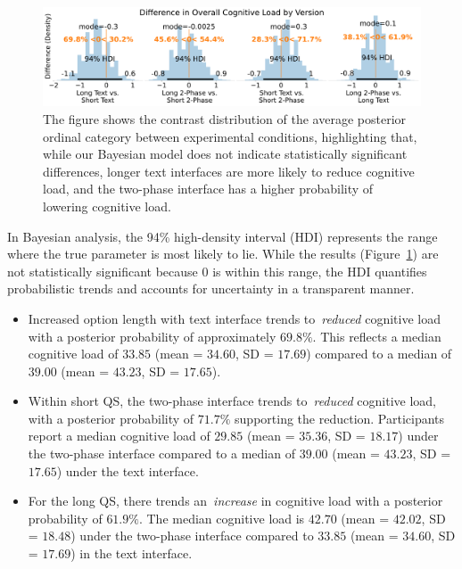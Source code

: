 \begin{figure}[h]
    \centering
    \includegraphics[width=\textwidth]{content/image/cog/weighted_cog_version_single_row.pdf}
    \caption{The figure shows the contrast distribution of the average posterior ordinal category between experimental conditions, highlighting that, while our Bayesian model does not indicate statistically significant differences, longer text interfaces are more likely to reduce cognitive load, and the two-phase interface has a higher probability of lowering cognitive load.}
    \label{fig:weighted_cog_version}
\end{figure}

In Bayesian analysis, the 94\% high-density interval (HDI) represents the range where the true parameter is most likely to lie. While the results (Figure~\ref{fig:weighted_cog_version}) are not statistically significant because 0 is within this range, the HDI quantifies probabilistic trends and accounts for uncertainty in a transparent manner.
\begin{itemize}
    \item Increased option length with text interface trends to~\textit{reduced} cognitive load with a posterior probability of approximately $69.8\%$. This reflects a median cognitive load of $33.85$ (mean = $34.60$, SD = $17.69$) compared to a median of $39.00$ (mean = $43.23$, SD = $17.65$).
    \item Within short QS, the two-phase interface trends to~\textit{reduced} cognitive load, with a posterior probability of $71.7\%$ supporting the reduction. Participants report a median cognitive load of $29.85$ (mean = $35.36$, SD = $18.17$) under the two-phase interface compared to a median of $39.00$ (mean = $43.23$, SD = $17.65$) under the text interface.
    \item For the long QS, there trends an~\textit{increase} in cognitive load with a posterior probability of $61.9\%$. The median cognitive load is $42.70$ (mean = $42.02$, SD = $18.48$) under the two-phase interface compared to $33.85$ (mean = $34.60$, SD = $17.69$) in the text interface.
\end{itemize}

